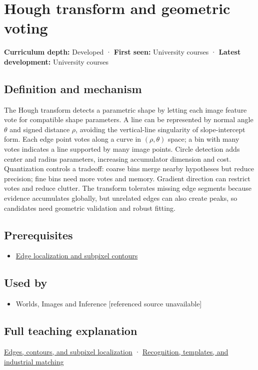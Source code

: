 \hypertarget{appendix-a5b0383b3b3e}{}
\section{Hough transform and geometric voting}\label{appendix-a5b0383b3b3e-hough-transform-and-geometric-voting}

\textbf{Curriculum depth:} Developed · \textbf{First seen:} University courses · \textbf{Latest development:} University courses

\subsection{Definition and mechanism}\label{appendix-a5b0383b3b3e-definition-and-mechanism}

The Hough transform detects a parametric shape by letting each image feature vote for compatible shape parameters. A line can be represented by normal angle \(\theta\) and signed distance \(\rho\), avoiding the vertical-line singularity of slope-intercept form. Each edge point votes along a curve in \((\rho,\theta)\) space; a bin with many votes indicates a line supported by many image points. Circle detection adds center and radius parameters, increasing accumulator dimension and cost. Quantization controls a tradeoff: coarse bins merge nearby hypotheses but reduce precision; fine bins need more votes and memory. Gradient direction can restrict votes and reduce clutter. The transform tolerates missing edge segments because evidence accumulates globally, but unrelated edges can also create peaks, so candidates need geometric validation and robust fitting.

\subsection{Prerequisites}\label{appendix-a5b0383b3b3e-prerequisites}

\begin{itemize}
\tightlist
\item
  \hyperref[appendix-36022286b03e]{Edge localization and subpixel contours}
\end{itemize}

\subsection{Used by}\label{appendix-a5b0383b3b3e-used-by}

\begin{itemize}
\tightlist
\item
  {Worlds, Images and Inference {[}referenced source unavailable{]}}
\end{itemize}

\subsection{Full teaching explanation}\label{appendix-a5b0383b3b3e-full-teaching-explanation}

\hyperref[04-visual-computing-ii-ch030-edges-contours-and-subpixel-localization]{Edges, contours, and subpixel localization} · \hyperref[04-visual-computing-ii-ch030-recognition-templates-and-industrial-matching]{Recognition, templates, and industrial matching}
